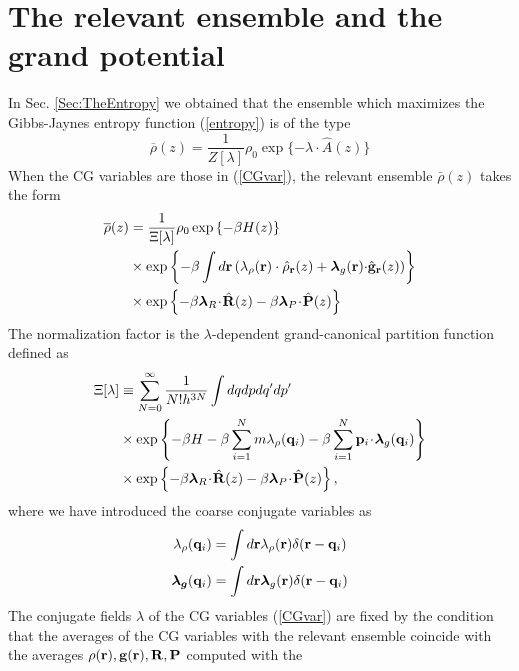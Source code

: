 \documentclass[b5paper,openright,10pt]{book}
\newcommand{\esc}{\!\cdot\!}
\begin{document}
\section{The relevant ensemble and the grand potential}
In Sec. \ref{Sec:TheEntropy} we obtained that the ensemble which maximizes the Gibbs-Jaynes entropy function (\ref{entropy}) is of the type
\begin{equation}
\overline{\rho}(z) = \frac{1}{Z[\lambda]} \rho_0\exp\{-\lambda\!\cdot\!\hat{A}(z)\}
\end{equation}
When the CG variables are those in (\ref{CGvar}), the relevant ensemble $\bar{\rho}(z)$ takes the form 
\begin{align}
  \overline{\rho}(z)&=\frac{1}{\Xi[\lambda]}\rho_0\exp\left\{-\beta H(z)\right\}
\nonumber\\
&\times
\exp\left\{-\beta\int d{\bf r}\left(\lambda_\rho({\bf r})\cdot\hat{\rho}_{\bf
    r}(z)+\boldsymbol{\lambda}_g{({\bf r})\cdot}\hat{\bf g}_{\bf r}(z)\right)\right\}
\nonumber\\
&\times
\exp\left\{-\beta \boldsymbol{\lambda}_{R}\esc\hat{\bf R}(z)
-\beta \boldsymbol{\lambda}_{P}\esc\hat{\bf P}(z)\right\}
\label{relensln}
\end{align}
The   normalization   factor   is  the   $\lambda$-dependent
grand-canonical partition function defined as
\begin{align}
  \Xi[\lambda]
  &\equiv
 \sum_{N=0}^\infty \frac{1}{N!h^{3N}}
\int dqdp dq'dp'
\nonumber\\
&\times\exp\left\{-\beta H-\beta \sum_{i=1}^Nm \lambda_\rho({\bf
    q}_i)-\beta \sum_{i=1}^N{\bf p}_i\esc\boldsymbol{\lambda}_g({\bf q}_i)\right\}
\nonumber\\
&\times\exp\left\{-\beta \boldsymbol{\lambda}_{R}\esc\hat{\bf R}(z)
-\beta \boldsymbol{\lambda}_{P}\esc\hat{\bf P}(z)\right\},
\label{xiln}
\end{align}
where we have introduced the coarse conjugate variables as
  \begin{align}
\lambda_\rho({\bf q}_i)&=
\int d{\bf r}\lambda_{\rho}({\bf r})\delta({\bf r}-{\bf q}_i)
\nonumber\\
\boldsymbol{\lambda_g}({\bf q}_i)&=
\int d{\bf r}\boldsymbol{\lambda}_g({\bf r})\delta({\bf r}-{\bf q}_i)
  \end{align}
The conjugate fields $\lambda$ of the CG variables (\ref{CGvar}) are fixed by the condition that the averages of the CG variables with the relevant ensemble coincide with the averages $\rho({\bf  r}),{\bf  g}({\bf
  r}),{\bf  R},{\bf  P}$  computed  with  the 
\end{document}
